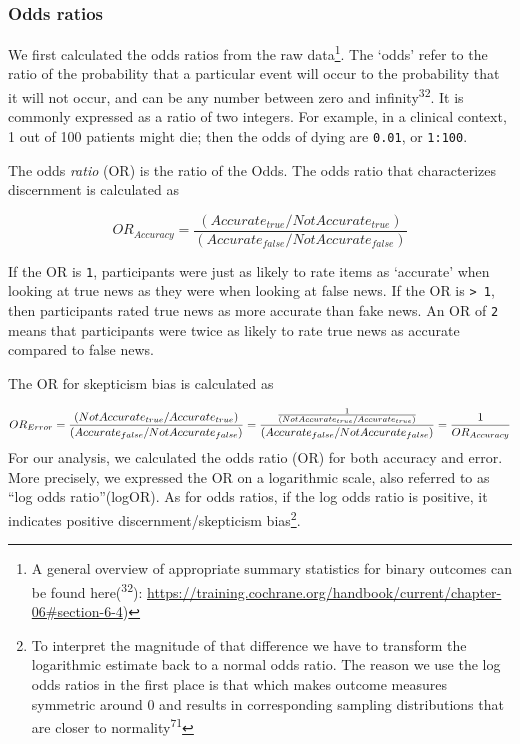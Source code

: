 \documentclass[
  doc,floatsintext]{apa6}
\begin{document}
\subsubsection{Odds ratios}\label{odds-ratios}

We first calculated the odds ratios from the raw data\footnote{A general overview of appropriate summary statistics for binary outcomes can be found here(\textsuperscript{32}): \url{https://training.cochrane.org/handbook/current/chapter-06\#section-6-4})}. The `odds' refer to the ratio of the probability that a particular event will occur to the probability that it will not occur, and can be any number between zero and infinity\textsuperscript{32}. It is commonly expressed as a ratio of two integers. For example, in a clinical context, 1 out of 100 patients might die; then the odds of dying are \texttt{0.01}, or \texttt{1:100}.

The odds \emph{ratio} (OR) is the ratio of the Odds. The odds ratio that characterizes discernment is calculated as

\[
OR_{Accuracy} = \frac{(Accurate_{true}/ NotAccurate_{true})}{(Accurate_{false}/ NotAccurate_{false})}
\]

If the OR is \texttt{1}, participants were just as likely to rate items as `accurate' when looking at true news as they were when looking at false news. If the OR is \texttt{\textgreater{}\ 1}, then participants rated true news as more accurate than fake news. An OR of \texttt{2} means that participants were twice as likely to rate true news as accurate compared to false news.

The OR for skepticism bias is calculated as

\[
OR_{Error} = \frac{(NotAccurate_{true}/Accurate_{true})}{(Accurate_{false}/NotAccurate_{false})} \leavevmode \newline
= \frac{\frac{1}{(NotAccurate_{true}/Accurate_{true})}}{(Accurate_{false}/NotAccurate_{false})} \leavevmode \newline
= \frac{1}{OR_{Accuracy}}
\]
For our analysis, we calculated the odds ratio (OR) for both accuracy and error. More precisely, we expressed the OR on a logarithmic scale, also referred to as ``log odds ratio''(logOR). As for odds ratios, if the log odds ratio is positive, it indicates positive discernment/skepticism bias\footnote{To interpret the magnitude of that difference we have to transform the logarithmic estimate back to a normal odds ratio. The reason we use the log odds ratios in the first place is that which makes outcome measures symmetric around 0 and results in corresponding sampling distributions that are closer to normality\textsuperscript{71}}.
\end{document}
